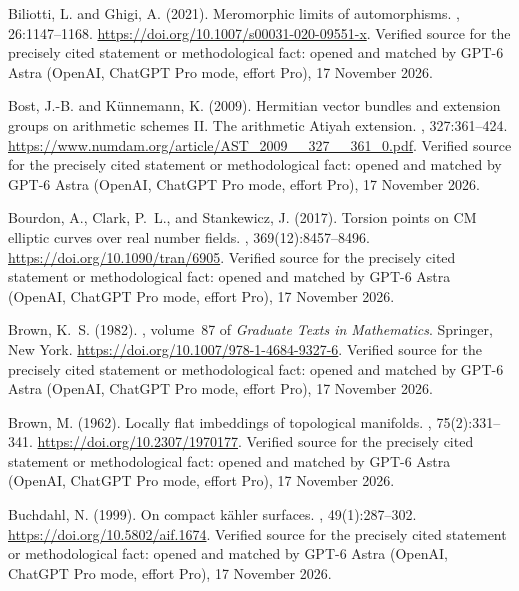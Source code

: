 \begin{thebibliography}{}
Biliotti, L. and Ghigi, A. (2021).
\newblock Meromorphic limits of automorphisms.
, 26:1147--1168.
\newblock \url{https://doi.org/10.1007/s00031-020-09551-x}. Verified source for the precisely cited statement or methodological fact: opened and matched by GPT-6 Astra (OpenAI, ChatGPT Pro mode, effort Pro), 17 November 2026.

Bost, J.-B. and K{\"u}nnemann, K. (2009).
\newblock Hermitian vector bundles and extension groups on arithmetic schemes
  {II}. {The} arithmetic {Atiyah} extension.
, 327:361--424.
\newblock \url{https://www.numdam.org/article/AST_2009__327__361_0.pdf}. Verified source for the precisely cited statement or methodological fact: opened and matched by GPT-6 Astra (OpenAI, ChatGPT Pro mode, effort Pro), 17 November 2026.

Bourdon, A., Clark, P.~L., and Stankewicz, J. (2017).
\newblock Torsion points on {CM} elliptic curves over real number fields.
,
  369(12):8457--8496.
\newblock \url{https://doi.org/10.1090/tran/6905}. Verified source for the precisely cited statement or methodological fact: opened and matched by GPT-6 Astra (OpenAI, ChatGPT Pro mode, effort Pro), 17 November 2026.

Brown, K.~S. (1982).
, volume~87 of {\em Graduate Texts in
  Mathematics}.
\newblock Springer, New York.
\newblock \url{https://doi.org/10.1007/978-1-4684-9327-6}. Verified source for the precisely cited statement or methodological fact: opened and matched by GPT-6 Astra (OpenAI, ChatGPT Pro mode, effort Pro), 17 November 2026.

Brown, M. (1962).
\newblock Locally flat imbeddings of topological manifolds.
, 75(2):331--341.
\newblock \url{https://doi.org/10.2307/1970177}. Verified source for the precisely cited statement or methodological fact: opened and matched by GPT-6 Astra (OpenAI, ChatGPT Pro mode, effort Pro), 17 November 2026.

Buchdahl, N. (1999).
\newblock On compact kähler surfaces.
, 49(1):287--302.
\newblock \url{https://doi.org/10.5802/aif.1674}. Verified source for the precisely cited statement or methodological fact: opened and matched by GPT-6 Astra (OpenAI, ChatGPT Pro mode, effort Pro), 17 November 2026.


\end{thebibliography}
